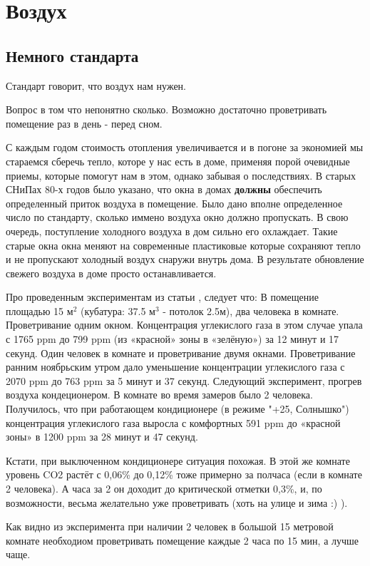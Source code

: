 \documentclass[12pt, twocolumn]{report}
\begin{document}
\part{Воздух}
\chapter{Немного стандарта}
Стандарт говорит, что воздух нам нужен.

Вопрос в том что непонятно сколько. Возможно достаточно проветривать помещение раз в день - перед сном.

С каждым годом стоимость отопления увеличивается и в погоне за экономией мы стараемся сберечь тепло, которе у нас есть в доме, применяя порой очевидные приемы, которые помогут нам в этом, однако забывая о последствиях. В старых СНиПах 80-х годов было указано, что окна в домах \textbf{должны} обеспечить определенный приток воздуха в помещение. Было дано вполне определенное число по стандарту, сколько иммено воздуха окно должно пропускать. В свою очередь, поступление холодного воздуха в дом сильно его охлаждает. Такие старые окна окна меняют на современные пластиковые которые сохраняют тепло и не пропускают холодный воздух снаружи внутрь дома. В результате обновление свежего воздуха в доме просто останавливается. 

Про проведенным экспериментам из статьи \cite{co2}, следует что:
В помещение площадью 15 $\text{м}^{2}$ (кубатура: 37.5 $\text{м}^3$ - потолок 2.5м), два человека в комнате. 
Проветривание одним окном. Концентрация углекислого газа в этом случае упала с 1765 ppm до 799 ppm (из «красной» зоны в «зелёную») за 12 минут и 17 секунд.
Один человек в комнате и проветривание двумя окнами. 
Проветривание ранним ноябрьским утром дало уменьшение концентрации углекислого газа с 2070 ppm до 763 ppm за 5 минут и 37 секунд.
Следующий эксперимент, прогрев воздуха кондеционером.
В комнате во время замеров было 2 человека. Получилось, что при работающем кондиционере (в режиме "+25, Солнышко") концентрация углекислого газа выросла с комфортных 591 ppm до «красной зоны» в 1200 ppm за 28 минут и 47 секунд.

Кстати, при выключенном кондиционере ситуация похожая. В этой же комнате уровень CO2 растёт с 0,06\% до 0,12\% тоже примерно за полчаса (если в комнате 2 человека). А часа за 2 он доходит до критической отметки 0,3\%, и, по возможности, весьма желательно уже проветривать (хоть на улице и зима :) ).

Как видно из эксперимента при наличии 2 человек в большой 15 метровой комнате необходиом проветривать помещение каждые 2 часа по 15 мин, а лучше чаще.
\end{document}
